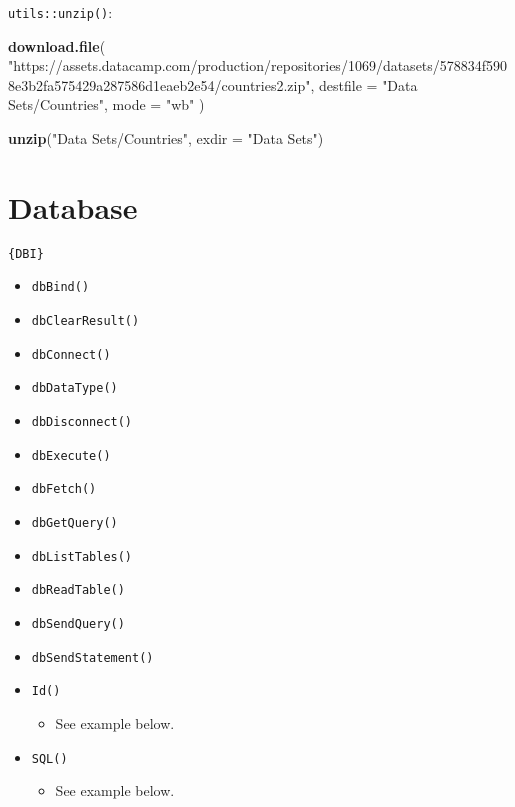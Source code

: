 \documentclass[
]{book}
\newenvironment{Shaded}{\begin{snugshade}}{\end{snugshade}}
\newcommand{\DataTypeTok}[1]{\textcolor[rgb]{0.13,0.29,0.53}{#1}}
\newcommand{\KeywordTok}[1]{\textcolor[rgb]{0.13,0.29,0.53}{\textbf{#1}}}
\newcommand{\NormalTok}[1]{#1}
\newcommand{\StringTok}[1]{\textcolor[rgb]{0.31,0.60,0.02}{#1}}
\providecommand{\tightlist}{%
  \setlength{\itemsep}{0pt}\setlength{\parskip}{0pt}}
\begin{document}
\texttt{utils::unzip()}:

\begin{Shaded}
\begin{Highlighting}[]
\KeywordTok{download.file}\NormalTok{(}
  \StringTok{"https://assets.datacamp.com/production/repositories/1069/datasets/578834f5908e3b2fa575429a287586d1eaeb2e54/countries2.zip"}\NormalTok{,}
  \DataTypeTok{destfile =} \StringTok{"Data Sets/Countries"}\NormalTok{,}
  \DataTypeTok{mode =} \StringTok{"wb"}
\NormalTok{)}

\KeywordTok{unzip}\NormalTok{(}\StringTok{"Data Sets/Countries"}\NormalTok{, }\DataTypeTok{exdir =} \StringTok{"Data Sets"}\NormalTok{)}
\end{Highlighting}
\end{Shaded}

\hypertarget{database}{%
\section{Database}\label{database}}

\texttt{\{DBI\}}

\begin{itemize}
\tightlist
\item
  \texttt{dbBind()}
\item
  \texttt{dbClearResult()}
\item
  \texttt{dbConnect()}
\item
  \texttt{dbDataType()}
\item
  \texttt{dbDisconnect()}
\item
  \texttt{dbExecute()}
\item
  \texttt{dbFetch()}
\item
  \texttt{dbGetQuery()}
\item
  \texttt{dbListTables()}
\item
  \texttt{dbReadTable()}
\item
  \texttt{dbSendQuery()}
\item
  \texttt{dbSendStatement()}
\item
  \texttt{Id()}

  \begin{itemize}
  \tightlist
  \item
    See example below.
  \end{itemize}
\item
  \texttt{SQL()}

  \begin{itemize}
  \tightlist
  \item
    See example below.
  \end{itemize}
\end{itemize}
\end{document}
